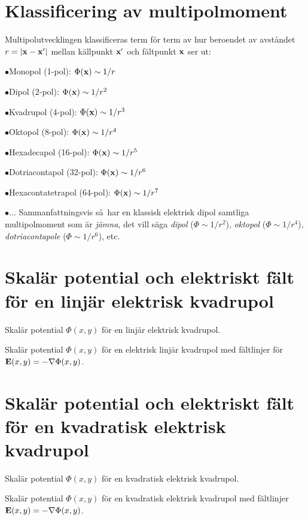 \section{Klassificering av multipolmoment}
Multipolutvecklingen klassificeras term f{\"o}r term av hur beroendet av
avst{\aa}ndet $r=|{\bf x}-{\bf x}'|$ mellan k{\"a}llpunkt ${\bf x}'$ och
f{\"a}ltpunkt ${\bf x}$ ser ut:
\item{$\bullet$}{Monopol           (1-pol):  $\Phi({\bf x})\sim 1/r$}
\item{$\bullet$}{Dipol             (2-pol):  $\Phi({\bf x})\sim 1/r^2$}
\item{$\bullet$}{Kvadrupol         (4-pol):  $\Phi({\bf x})\sim 1/r^3$}
\item{$\bullet$}{Oktopol           (8-pol):  $\Phi({\bf x})\sim 1/r^4$}
\item{$\bullet$}{Hexadecapol       (16-pol): $\Phi({\bf x})\sim 1/r^5$}
\item{$\bullet$}{Dotriacontapol    (32-pol): $\Phi({\bf x})\sim 1/r^6$}
\item{$\bullet$}{Hexacontatetrapol (64-pol): $\Phi({\bf x})\sim 1/r^7$}
\item{$\bullet$}{$\ldots$}
\medskip
\noindent
Sammanfattningsvis s\aa\ har en klassisk elektrisk dipol samtliga
multipolmoment som \"ar {\it j\"amna}, det vill s\"aga {\it dipol}
($\Phi\sim 1/r^2$), {\it oktopol} ($\Phi\sim 1/r^4$), {\it dotriacontapole}
($\Phi\sim 1/r^6$), etc.
\vfill\eject
\section{Skal{\"a}r potential och elektriskt f{\"a}lt f{\"o}r en linj{\"a}r
         elektrisk kvadrupol}
\centerline{\epsfxsize=142mm
  }
\noindent
{\captionwide Skal{\"a}r potential $\Phi(x,y)$ f{\"o}r en linj{\"a}r elektrisk
kvadrupol.}
\medskip
\centerline{\epsfxsize=142mm
  }
\noindent
{\captionwide Skal{\"a}r potential $\Phi(x,y)$ f{\"o}r en elektrisk linj{\"a}r
kvadrupol med f{\"a}ltlinjer f{\"o}r ${\bf E}(x,y)=-\nabla\Phi(x,y)$.}
\vfill\eject

\section{Skal{\"a}r potential och elektriskt f{\"a}lt f{\"o}r en kvadratisk
         elektrisk kvadrupol}
\centerline{\epsfxsize=142mm
  }
\noindent
{\captionwide Skal{\"a}r potential $\Phi(x,y)$ f{\"o}r en kvadratisk elektrisk
kvadrupol.}
\medskip
\centerline{\epsfxsize=142mm
  }
\noindent
{\captionwide Skal{\"a}r potential $\Phi(x,y)$ f{\"o}r en kvadratisk
elektrisk kvadrupol med f{\"a}ltlinjer ${\bf E}(x,y)=-\nabla\Phi(x,y)$.}

